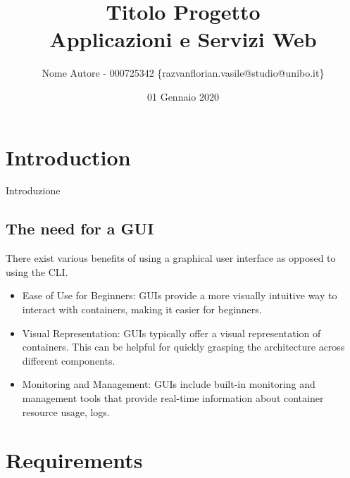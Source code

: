 \documentclass[multi, tikz]{article}
\title{
    Titolo Progetto \\
    \large Applicazioni e Servizi Web
}
\author{Nome Autore - 000725342 \{razvanflorian.vasile@studio@unibo.it\}}
\date{01 Gennaio 2020}
\begin{document}
\maketitle
\section{Introduction}
Introduzione \citep{adams1995hitchhiker}
\subsection{The need for a GUI}
There exist various benefits of using a graphical user interface as opposed to using the CLI.

\begin{itemize}
\item Ease of Use for Beginners: GUIs provide a more visually intuitive way to
  interact with containers, making it easier for beginners.
\item Visual Representation: GUIs typically offer a visual representation of
  containers. This can be helpful for quickly grasping the architecture across
  different components.
\item Monitoring and Management: GUIs include built-in monitoring and management
  tools that provide real-time information about container resource usage, logs.
\end{itemize}

\section{Requirements}
\end{document}

